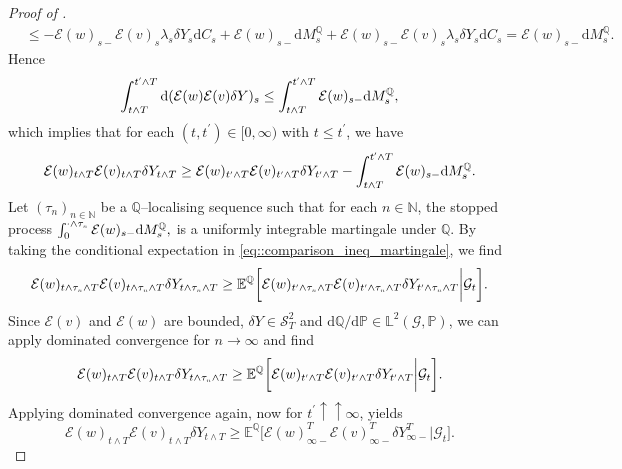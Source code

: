 \documentclass[10pt]{article} %
\newcommand\cE{\mathcal E}
\newcommand\cG{\mathcal G}
\newcommand\cS{\mathcal S}
\newcommand{\smalltext}[1]{\text{\fontsize{4}{4}\selectfont$#1$}}
\def \E{\mathbb{E}}
\def \L{\mathbb{L}}
\def \N{\mathbb{N}}
\def \P{\mathbb{P}}
\def \Q{\mathbb{Q}}
\def\d{\mathrm{d}}
\begin{document}
\begin{proof}[Proof of ]
\begin{align*}
		&\leq -\cE(w)_{s-}\cE(v)_s\lambda_s\delta Y_s \d C_s + \cE(w)_{s-}\d M^\Q_s + \cE(w)_{s-}\cE(v)_s \lambda_s \delta Y_s\d C_s = \cE(w)_{s-}\d M^\Q_s.
	\end{align*}
	Hence
	\begin{equation*}
		\int_{t \land T}^{t^\smalltext{\prime} \land T} \d (\cE(w)\cE(v)\delta Y)_s \leq \int_{t \land T}^{t^\smalltext{\prime} \land T}\cE(w)_{s-}\d M^\Q_s,
	\end{equation*}
	which implies that for each $(t,t^\prime) \in [0,\infty)$ with $t \leq t^\prime$, we have
	\begin{equation}\label{eq::comparison_ineq_martingale}
		\cE(w)_{t \land T}\cE(v)_{t \land T}\delta Y_{t \land T} \geq \cE(w)_{t^\smalltext{\prime} \land T}\cE(v)_{t^\smalltext{\prime} \land T}\delta Y_{t^\smalltext{\prime} \land T} - \int_{t \land T}^{t^\smalltext{\prime} \land T}\cE(w)_{s-}\d M^\Q_s.
	\end{equation}
	Let $(\tau_n)_{n \in \N}$ be a $\Q$--localising sequence such that for each $n \in \N$, the stopped process $\int_0^{\cdot \land \tau_\smalltext{n}} \cE(w)_{s-} \d M^\Q_s,$ is a uniformly integrable martingale under $\Q$. By taking the conditional expectation in \eqref{eq::comparison_ineq_martingale}, we find
	\begin{equation}\label{eq::comp_limit_n}
		\cE(w)_{t \land \tau_\smalltext{n} \land T}\cE(v)_{t \land \tau_\smalltext{n} \land T}\delta Y_{t \land \tau_\smalltext{n} \land T} \geq \E^\Q\bigg[ \cE(w)_{t^\smalltext{\prime} \land \tau_\smalltext{n} \land T}\cE(v)_{t^\smalltext{\prime} \land \tau_\smalltext{n} \land T}\delta Y_{t^\smalltext{\prime} \land \tau_\smalltext{n} \land T} \bigg| \cG_t\bigg].
	\end{equation}
	Since $\cE(v)$ and $\cE(w)$ are bounded, $\delta Y \in \cS^2_T$ and $\d\Q/\d\P \in \L^2(\cG,\P)$, we can apply dominated convergence for $n \longrightarrow \infty$ and find
	\begin{equation}\label{eq::comp_limit_t}
		\cE(w)_{t \land T}\cE(v)_{t \land T}\delta Y_{t \land \tau_\smalltext{n} \land T} \geq \E^\Q\bigg[ \cE(w)_{t^\smalltext{\prime} \land T}\cE(v)_{t^\smalltext{\prime} \land T}\delta Y_{t^\smalltext{\prime} \land T} \bigg| \cG_t\bigg].
	\end{equation}
	Applying dominated convergence again, now for $t^\prime \uparrow\uparrow \infty$, yields
	\begin{equation}\label{eq::comparison_cond_exp}
		\cE(w)_{t \land T}\cE(v)_{t \land T}\delta Y_{t \land T} \geq \E^\Q\bigg[ \cE(w)^T_{\infty-}\cE(v)^T_{\infty-}\delta Y^T_{\infty-} \bigg| \cG_t\bigg].

\end{equation}
\end{proof}
\end{document}
